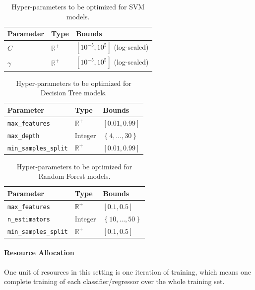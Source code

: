 \documentclass[runningheads,a4paper]{llncs}
\begin{document}
\begin{table}[ht]
\centering
\begin{tabular}{@{}lll@{}}
\toprule
\textbf{Parameter} & \textbf{Type}                      & \textbf{Bounds}               \\ \midrule
$C$                & $\mathbb{R}^+$ & $\left[ 10^{-5}, 10^{5} \right]$ (log-scaled) \\
$\gamma$           & $\mathbb{R}^+$ & $\left[10^{-5}, 10^{5} \right]$  (log-scaled)       \\ \bottomrule
\end{tabular}
\caption{Hyper-parameters to be optimized for SVM models.}
\label{svmparam}
\end{table}

\begin{table}[ht]
\centering
\begin{tabular}{@{}lll@{}}
\toprule
\textbf{Parameter}             & \textbf{Type}  & \textbf{Bounds}                          \\ \midrule
\texttt{max\_features}      & $\mathbb{R}^+$ & $\left[0.01, 0.99\right]$   \\
\texttt{max\_depth}          & Integer        & $\left\lbrace 4, \dots, 30 \right\rbrace$ \\
\texttt{min\_samples\_split}  & $\mathbb{R}^+$  & $\left[0.01, 0.99\right]$
\end{tabular}
\caption{Hyper-parameters to be optimized for Decision Tree models.}
\label{treeparam}
\end{table}

\begin{table}[ht]
\centering
\begin{tabular}{@{}lll@{}}
\toprule
\textbf{Parameter}             & \textbf{Type}  & \textbf{Bounds}                          \\ \midrule
\texttt{max\_features}      & $\mathbb{R}^+$ & $\left[0.1, 0.5\right]$   \\
\texttt{n\_estimators}          & Integer        & $\left\lbrace 10, \dots, 50 \right\rbrace$ \\
\texttt{min\_samples\_split}  & $\mathbb{R}^+$  & $\left[0.1, 0.5\right]$
\end{tabular}
\caption{Hyper-parameters to be optimized for Random Forest models.}
\label{rfparam}
\end{table}

\paragraph{\textbf{Resource Allocation}} One unit of resources in this setting is one iteration of training, which means one complete training of each classifier/regressor over the whole training set.  
\end{document}
